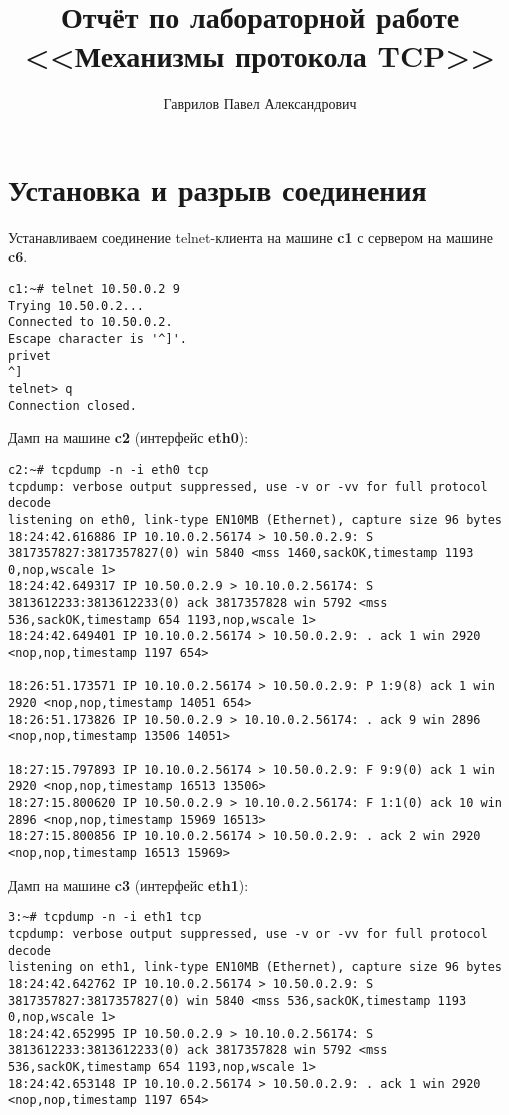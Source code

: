 \documentclass[a4paper,12pt]{article}
\title{Отчёт по лабораторной работе \\ <<Механизмы протокола TCP>>}
\author{Гаврилов Павел Александрович}
\begin{document}
\maketitle

\tableofcontents

\section{Установка и разрыв соединения}

Устанавливаем соединение telnet-клиента на машине \textbf{c1} с
сервером на машине \textbf{c6}.

\begin{lstlisting}
c1:~# telnet 10.50.0.2 9
Trying 10.50.0.2...
Connected to 10.50.0.2.
Escape character is '^]'.
privet
^]
telnet> q
Connection closed.
\end{lstlisting}

Дамп на машине \textbf{c2} (интерфейс \textbf{eth0}):

\begin{lstlisting}
c2:~# tcpdump -n -i eth0 tcp
tcpdump: verbose output suppressed, use -v or -vv for full protocol decode
listening on eth0, link-type EN10MB (Ethernet), capture size 96 bytes
18:24:42.616886 IP 10.10.0.2.56174 > 10.50.0.2.9: S 3817357827:3817357827(0) win 5840 <mss 1460,sackOK,timestamp 1193 0,nop,wscale 1>
18:24:42.649317 IP 10.50.0.2.9 > 10.10.0.2.56174: S 3813612233:3813612233(0) ack 3817357828 win 5792 <mss 536,sackOK,timestamp 654 1193,nop,wscale 1>
18:24:42.649401 IP 10.10.0.2.56174 > 10.50.0.2.9: . ack 1 win 2920 <nop,nop,timestamp 1197 654>

18:26:51.173571 IP 10.10.0.2.56174 > 10.50.0.2.9: P 1:9(8) ack 1 win 2920 <nop,nop,timestamp 14051 654>
18:26:51.173826 IP 10.50.0.2.9 > 10.10.0.2.56174: . ack 9 win 2896 <nop,nop,timestamp 13506 14051>

18:27:15.797893 IP 10.10.0.2.56174 > 10.50.0.2.9: F 9:9(0) ack 1 win 2920 <nop,nop,timestamp 16513 13506>
18:27:15.800620 IP 10.50.0.2.9 > 10.10.0.2.56174: F 1:1(0) ack 10 win 2896 <nop,nop,timestamp 15969 16513>
18:27:15.800856 IP 10.10.0.2.56174 > 10.50.0.2.9: . ack 2 win 2920 <nop,nop,timestamp 16513 15969>
\end{lstlisting}

Дамп на машине \textbf{c3} (интерфейс \textbf{eth1}):
\begin{lstlisting}
3:~# tcpdump -n -i eth1 tcp
tcpdump: verbose output suppressed, use -v or -vv for full protocol decode
listening on eth1, link-type EN10MB (Ethernet), capture size 96 bytes
18:24:42.642762 IP 10.10.0.2.56174 > 10.50.0.2.9: S 3817357827:3817357827(0) win 5840 <mss 536,sackOK,timestamp 1193 0,nop,wscale 1>
18:24:42.652995 IP 10.50.0.2.9 > 10.10.0.2.56174: S 3813612233:3813612233(0) ack 3817357828 win 5792 <mss 536,sackOK,timestamp 654 1193,nop,wscale 1>
18:24:42.653148 IP 10.10.0.2.56174 > 10.50.0.2.9: . ack 1 win 2920 <nop,nop,timestamp 1197 654>
\end{lstlisting}
\end{document}
